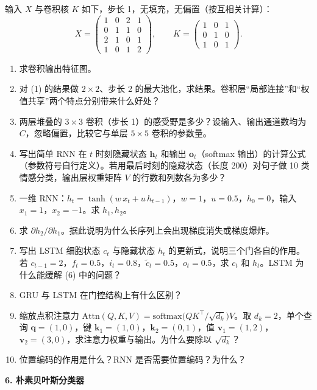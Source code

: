 输入 $X$ 与卷积核 $K$ 如下，步长 1，无填充，无偏置（按互相关计算）：
\[
X=\begin{pmatrix}1&0&2&1\\0&1&1&0\\2&1&0&1\\1&0&1&2\end{pmatrix},\qquad
K=\begin{pmatrix}1&0&1\\0&1&0\\1&0&1\end{pmatrix}.
\]
\begin{enumerate}[label=(\arabic*)]
\item 求卷积输出特征图。
\item 对 (1) 的结果做 $2\times2$、步长 2 的最大池化，求结果。卷积层“局部连接”和“权值共享”两个特点分别带来什么好处？
\item 两层堆叠的 $3\times3$ 卷积（步长 1）的感受野是多少？设输入、输出通道数均为 $C$，忽略偏置，比较它与单层 $5\times5$ 卷积的参数量。
\item 写出简单 RNN 在 $t$ 时刻隐藏状态 $\bm h_t$ 和输出 $\bm o_t$（softmax 输出）的计算公式（参数符号自行定义）。若用最后时刻的隐藏状态（长度 200）对句子做 10 类情感分类，输出层权重矩阵 $V$ 的行数和列数各为多少？
\item 一维 RNN：$h_t=\tanh(w\,x_t+u\,h_{t-1})$，$w=1$，$u=0.5$，$h_0=0$，输入 $x_1=1$，$x_2=-1$。求 $h_1,h_2$。
\item 求 $\partial h_2/\partial h_1$。据此说明为什么长序列上会出现梯度消失或梯度爆炸。
\item 写出 LSTM 细胞状态 $c_t$ 与隐藏状态 $h_t$ 的更新式，说明三个门各自的作用。若 $c_{t-1}=2$，$f_t=0.5$，$i_t=0.8$，$\tilde c_t=0.5$，$o_t=0.5$，求 $c_t$ 和 $h_t$。LSTM 为什么能缓解 (6) 中的问题？
\item GRU 与 LSTM 在门控结构上有什么区别？
\item 缩放点积注意力 $\mathrm{Attn}(Q,K,V)=\mathrm{softmax}\!\big(QK^\top/\sqrt{d_k}\big)V$。取 $d_k=2$，单个查询 $\bm q=(1,0)$，键 $\bm k_1=(1,0)$，$\bm k_2=(0,1)$，值 $\bm v_1=(1,2)$，$\bm v_2=(3,0)$，求注意力权重与输出。为什么要除以 $\sqrt{d_k}$？
\item 位置编码的作用是什么？RNN 是否需要位置编码？为什么？
\end{enumerate}

\bigskip
\noindent\textbf{6. 朴素贝叶斯分类器}

